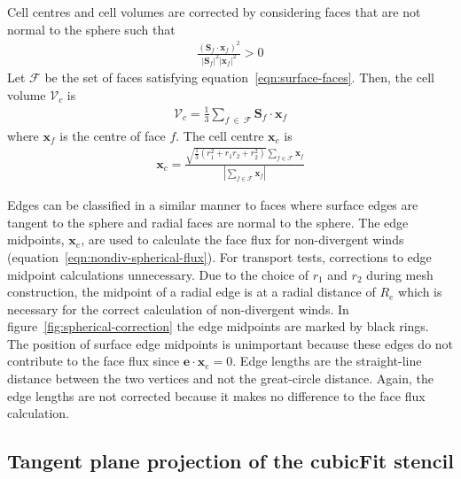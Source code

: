 Cell centres and cell volumes are corrected by considering faces that are not normal to the sphere such that
\begin{align}
	\frac{\left(\mathbf{S}_f \cdot \mathbf{x}_f\right)^2}{\left\lvert \mathbf{S}_f \right\rvert^2 \left\lvert \mathbf{x}_f \right\rvert^2} > 0 \label{eqn:surface-faces}
\end{align}
Let $\mathcal{F}$ be the set of faces satisfying equation~\eqref{eqn:surface-faces}.  Then, the cell volume $\mathcal{V}_c$ is
\begin{align}
	\mathcal{V}_c = \frac{1}{3} \sum_{f\:\in\:\mathcal{F}} \mathbf{S}_f \cdot \mathbf{x}_f
\end{align}
where $\mathbf{x}_f$ is the centre of face $f$.
The cell centre $\mathbf{x}_c$ is
\begin{align}
	\mathbf{x}_c = \frac{\sqrt{\frac{1}{3} \left(r_1^2 + r_1 r_2 + r_2^2\right)}\sum_{f\in\mathcal{F}} \mathbf{x}_f}{\left\lvert \sum_{f\in\mathcal{F}} \mathbf{x}_f \right\rvert}
\end{align}

Edges can be classified in a similar manner to faces where surface edges are tangent to the sphere and radial faces are normal to the sphere.  The edge midpoints, $\mathbf{x}_e$, are used to calculate the face flux for non-divergent winds (equation~\eqref{eqn:nondiv-spherical-flux}).
For transport tests, corrections to edge midpoint calculations unnecessary.  Due to the choice of $r_1$ and $r_2$ during mesh construction, the midpoint of a radial edge is at a radial distance of $R_e$ which is necessary for the correct calculation of non-divergent winds.
In figure~\ref{fig:spherical-correction} the edge midpoints are marked by black rings.
The position of surface edge midpoints is unimportant because these edges do not contribute to the face flux since $\mathbf{e} \cdot \mathbf{x}_e = 0$.
Edge lengths are the straight-line distance between the two vertices and not the great-circle distance.  Again, the edge lengths are not corrected because it makes no difference to the face flux calculation.

\subsection*{Tangent plane projection of the cubicFit stencil}
